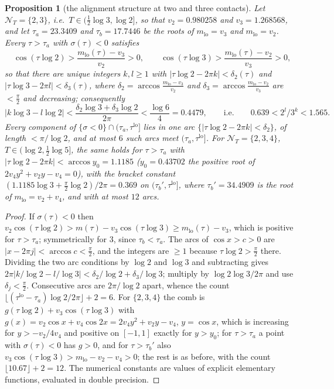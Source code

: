 \documentclass[11pt]{amsart}
\newtheorem{proposition}[theorem]{Proposition}
\theoremstyle{definition}
\theoremstyle{remark}
\newcommand{\NT}{\mathcal N_T}
\begin{document}
\begin{proposition}[the alignment structure at two and three contacts]\label{prop:align}
Let $\NT=\{2,3\}$, i.e.\ $T\in(\frac12\log3,\log2]$, so that $v_2=0.980258$ and $v_3=1.268568$, and let
$\tau_a=23.3409$ and $\tau_b=17.7446$ be the roots of $m_{\mathrm{lo}}=v_3$ and $m_{\mathrm{lo}}=v_2$. Every
$\tau>\tau_a$ with $\sigma(\tau)<0$ satisfies
\[
\cos(\tau\log2)>\frac{m_{\mathrm{lo}}(\tau)-v_3}{v_2}>0,\qquad\cos(\tau\log3)>\frac{m_{\mathrm{lo}}(\tau)-v_2}{v_3}>0,
\]
so that there are unique integers $k,l\ge1$ with $|\tau\log2-2\pi k|<\delta_2(\tau)$ and
$|\tau\log3-2\pi l|<\delta_3(\tau)$, where $\delta_2=\arccos\frac{m_{\mathrm{lo}}-v_3}{v_2}$ and
$\delta_3=\arccos\frac{m_{\mathrm{lo}}-v_2}{v_3}$ are $<\frac\pi2$ and decreasing; consequently
\[
|k\log3-l\log2|<\frac{\delta_2\log3+\delta_3\log2}{2\pi}<\frac{\log6}4=0.4479,\qquad\text{i.e.}\qquad
0.639<2^l/3^k<1.565 .
\]
Every component of $\{\sigma<0\}\cap(\tau_a,\tau^{\mathrm{lo}}]$ lies in one arc $\{|\tau\log2-2\pi k|<\delta_2\}$,
of length $<\pi/\log2$, and at most $6$ such arcs meet $(\tau_a,\tau^{\mathrm{lo}}]$. For $\NT=\{2,3,4\}$,
$T\in(\log2,\frac12\log5]$, the same holds for $\tau>\tau_a$ with $|\tau\log2-2\pi k|<\arccos y_0=1.1185$
($y_0=0.43702$ the positive root of $2v_4y^2+v_2y-v_4=0$), with the bracket constant
$(1.1185\log3+\frac\pi2\log2)/2\pi=0.369$ on $(\tau_b',\tau^{\mathrm{lo}}]$, where $\tau_b'=34.4909$ is the root of
$m_{\mathrm{lo}}=v_2+v_4$, and with at most $12$ arcs.
\end{proposition}
\begin{proof}
If $\sigma(\tau)<0$ then $v_2\cos(\tau\log2)>m(\tau)-v_3\cos(\tau\log3)\ge m_{\mathrm{lo}}(\tau)-v_3$, which is
positive for $\tau>\tau_a$; symmetrically for $3$, since $\tau_b<\tau_a$. The arcs of $\cos x>c>0$ are
$|x-2\pi j|<\arccos c<\frac\pi2$, and the integers are $\ge1$ because $\tau\log2>\frac\pi2$ there. Dividing the two
arc conditions by $\log2$ and $\log3$ and subtracting gives
$2\pi|k/\log2-l/\log3|<\delta_2/\log2+\delta_3/\log3$; multiply by $\log2\log3/2\pi$ and use $\delta_j<\frac\pi2$.
Consecutive arcs are $2\pi/\log2$ apart, whence the count $\lfloor(\tau^{\mathrm{lo}}-\tau_a)\log2/2\pi\rfloor+2=6$. For
$\{2,3,4\}$ the comb is $g(\tau\log2)+v_3\cos(\tau\log3)$ with $g(x)=v_2\cos x+v_4\cos2x=2v_4y^2+v_2y-v_4$,
$y=\cos x$, which is increasing for $y>-v_2/4v_4$ and positive on $[-1,1]$ exactly for $y>y_0$; for
$\tau>\tau_a$ a point with $\sigma(\tau)<0$ has $g>0$, and for $\tau>\tau_b'$ also
$v_3\cos(\tau\log3)>m_{\mathrm{lo}}-v_2-v_4>0$; the rest is as before, with the count $\lfloor10.67\rfloor+2=12$.
The numerical constants are values of explicit elementary functions, evaluated in double precision.
\end{proof}
\end{document}
